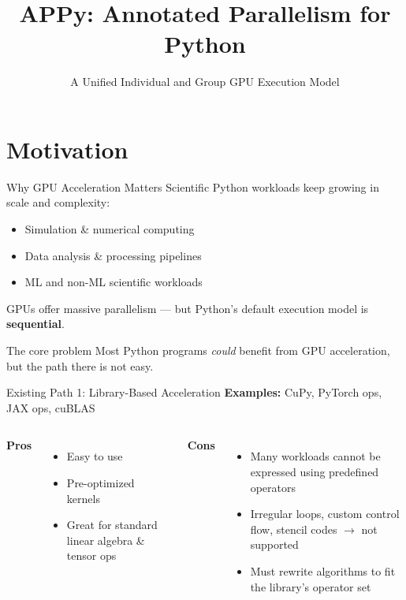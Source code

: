 \documentclass[aspectratio=169]{beamer}
\title{APPy: Annotated Parallelism for Python}
\subtitle{A Unified Individual and Group GPU Execution Model}
\author{}
\date{}
\begin{document}
\maketitle

\section{Motivation}

\begin{frame}{Why GPU Acceleration Matters}
  Scientific Python workloads keep growing in scale and complexity:
  \begin{itemize}
    \item Simulation \& numerical computing
    \item Data analysis \& processing pipelines
    \item ML and non-ML scientific workloads
  \end{itemize}
  \vspace{1em}
  GPUs offer massive parallelism — but Python's default execution model is \textbf{sequential}.

  \vspace{1em}
  \begin{alertblock}{The core problem}
    Most Python programs \emph{could} benefit from GPU acceleration, but the path there is not easy.
  \end{alertblock}
\end{frame}

\begin{frame}{Existing Path 1: Library-Based Acceleration}
  \textbf{Examples:} CuPy, PyTorch ops, JAX ops, cuBLAS
  \vspace{0.5em}

  \begin{columns}
    \textbf{Pros}
    \begin{itemize}
      \item Easy to use
      \item Pre-optimized kernels
      \item Great for standard linear algebra \& tensor ops
    \end{itemize}

    \textbf{Cons}
    \begin{itemize}
      \item Many workloads cannot be expressed using predefined operators
      \item Irregular loops, custom control flow, stencil codes $\to$ not supported
      \item Must rewrite algorithms to fit the library's operator set
    \end{itemize}
  \end{columns}
\end{frame}
\end{document}
